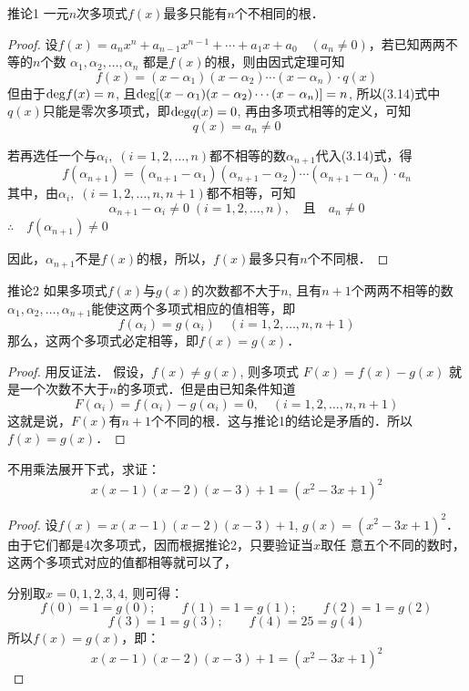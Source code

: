 \begin{blk}{推论1}
    一元$n$次多项式$f(x)$最多只能有$n$个不相同的根．
\end{blk}

\begin{proof}
设$f(x)=a_nx^n+a_{n-1}x^{n-1}+\cdots+a_1x+a_0\quad (a_n\ne 0)$，若已知两两不等的$n$个数
$\alpha_1, \alpha_2, \ldots, \alpha_n$
都是$f(x)$的根，则由因式定理可知
\begin{equation}
    f (x) = (x-\alpha_1) (x-\alpha_2)\cdots (x-\alpha_n)\cdot q(x)
\end{equation}
但由于${\rm deg}f(x)=n$, 且${\rm deg}[(x-\alpha_1)(x-\alpha_2)\cdots(x-\alpha_n)]=n$, 所以(3.14)式中$q(x)$只能是零次多项式，即${\rm deg}q(x)=0$, 再由多项式相等的定义，可知
\[q (x) =a_n\ne 0\]

若再选任一个与$\alpha_i,\; (i=1, 2,\ldots,n)$都不相等的数$\alpha_{n+1}$代入(3.14)式，得
\[f(\alpha_{n+1})=(\alpha_{n+1}-\alpha_{1})(\alpha_{n+1}-\alpha_2)\cdots (\alpha_{n+1}-\alpha_n)\cdot a_n\]
其中，由$\alpha_i,\; (i=1, 2,\ldots,n,n+1)$都不相等，可知
\[\alpha_{n+1}-\alpha_i\ne 0\;  (i=1, 2,\ldots,n),\quad \text{且}\quad a_n\ne 0\]
$\therefore\quad f(\alpha_{n+1}) \ne 0$

因此，$\alpha_{n+1}$不是$f(x)$的根，所以，$f(x)$最多只有$n$个不同根．
\end{proof}

\begin{blk}{推论2}
如果多项式$f(x)$与$g(x)$的次数都不大于$n$, 且有$n+1$个两两不相等的数$\alpha_1,\alpha_2,\ldots,\alpha_{n+1}$能使这两个多项式相应的值相等，即   
\[f(\alpha_i)=g(\alpha_i)\quad (i=1,2,\ldots,n,n+1)\]
 那么，这两个多项式必定相等，即$f(x)=g(x)$．
\end{blk}

\begin{proof}用反证法．
假设，$f(x)\ne g(x)$, 则多项式
$F (x) =f (x) -g (x)$
就是一个次数不大于$n$的多项式．但是由已知条件知道
\[F (\alpha_i) =f (\alpha_i) -g (\alpha_i)=0,\quad  (i=1,2,\ldots,n,n+1)\]
这就是说，$F(x)$有$n+1$个不同的根．这与推论1的结论是矛盾的．所以
$f (x) =g (x)$．
\end{proof}

\begin{example}
    不用乘法展开下式，求证：
\[x(x-1) (x-2)(x-3)+1=(x^2-3x+1)^2\]
\end{example}

\begin{proof}
    设$f(x)=x(x-1)(x-2)(x-3)+1$, $
g (x) = (x^2-3x+1)^2$．
由于它们都是4次多项式，因而根据推论2，只要验证当$x$取任    
意五个不同的数时，这两个多项式对应的值都相等就可以了，

分别取$x=0, 1, 2, 3, 4$, 则可得：
\[f (0) =1=g (0);\qquad f (1) =1=g (1) ;\qquad f (2) =1=g (2)\]
\[ f (3) =1=g (3) ;\qquad f (4) =25=g (4) \]
所以$f (x) =g (x) $，即：
\[x (x-1) (x-2) (x-3)+1=(x^2-3x+1)^2\]
\end{proof}


